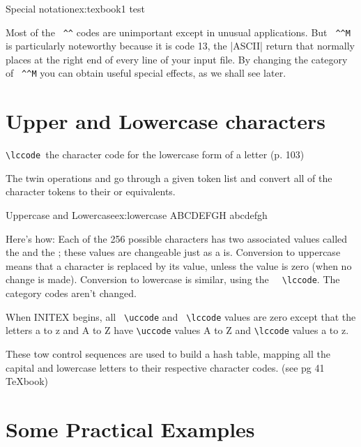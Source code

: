 \begin{texexample}{Special notation}{ex:texbook1}
\def\^^zz{test}
\^^zz
\end{texexample}


Most of the \verb+ ^^+ codes are unimportant except in unusual applications. But
\verb+ ^^M+ is particularly noteworthy because it is code 13, the |ASCII| return that
\tex normally places at the right end of every line of your input file. By changing the
category of \verb+ ^^M+  you can obtain useful special effects, as we shall see later.

\section{Upper and Lowercase characters}

\verb*+\lccode +the character code for the lowercase form of a letter (p. 103)

\DescribeMacro{\lowercase}
\DescribeMacro{\uppercase}
The twin operations \cmd{\uppercase} and \cmd{\lowercase}
go through a given token list and convert all of the character tokens to their
\cmd{\uppercase}  or  equivalents.

\begin{texexample}{Uppercase and Lowercase}{ex:lowercase} 
\uppercase{abcdefgh} 
\lowercase{ABCDEFGH}
\end{texexample}

Here's how: Each of the 256 possible characters
has two associated values called the \cmd{\uccode} and the ; these values are
changeable just as a \cmd{\catcode} is. Conversion to uppercase means that a character
is replaced by its \cmd{\uccode} value, unless the \cmd{\uccode} value is zero (when no change
is made). Conversion to lowercase is similar, using the
\verb+  \lccode+. The category codes
aren't changed. 

When INITEX begins, all \verb+ \uccode+ and \verb+ \lccode+ values are zero except
that the letters a to z and A to Z have \verb+\uccode+ values A to Z and \verb+\lccode+ values a to z.

These tow control sequences are used to build a hash table, mapping all the capital and lowercase letters to their respective character codes.
(see pg 41 TeXbook)

\section{Some Practical Examples}

